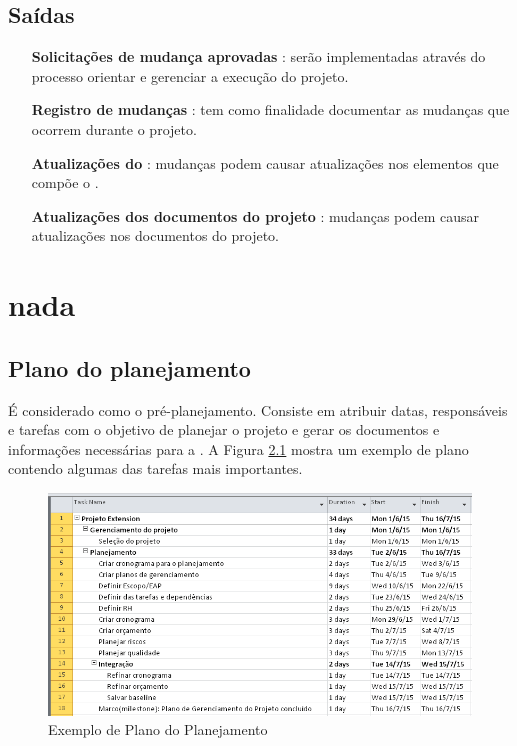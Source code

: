 \section{Saídas}

\begin{itemize}
	
	
	\item[\textbf{Solicitações de mudança aprovadas}] : serão implementadas através do processo orientar e gerenciar a execução do projeto.
	
	\item[\textbf{Registro de mudanças}] : tem como finalidade documentar as mudanças que ocorrem durante o projeto.
	
	\item[\textbf{Atualizações do \planproj}] :	mudanças podem causar atualizações nos elementos que compõe o \planproj.
	
	\item[\textbf{Atualizações dos documentos do projeto}] : mudanças podem causar atualizações nos documentos do projeto.
	
\end{itemize}


\chapter{nada}

\section{Plano do planejamento}

É considerado como o pré-planejamento. Consiste em atribuir datas, responsáveis e tarefas com o objetivo de planejar o projeto e gerar os documentos e informações necessárias para a \kick. A Figura \ref{fig:plano:planejamento} mostra um exemplo de plano contendo algumas das tarefas mais importantes.

\begin{figure}[!h]
\centering
\includegraphics[scale=0.5]{Figuras/plano_planejamento.png}
\caption{Exemplo de Plano do Planejamento}
\label{fig:plano:planejamento}
\end{figure}

